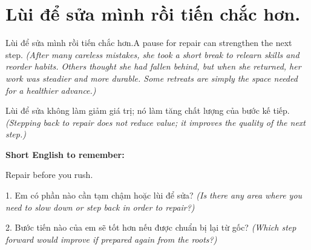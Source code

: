 \section{Lùi để sửa mình rồi tiến chắc hơn.}
\begin{truyen}{Lùi để sửa mình rồi tiến chắc hơn.}{A pause for repair can strengthen the next step.}
\textit{(After many careless mistakes, she took a short break to relearn skills and reorder habits. Others thought she had fallen behind, but when she returned, her work was steadier and more durable. Some retreats are simply the space needed for a healthier advance.)}
\end{truyen}
\begin{baihoc}
Lùi để sửa không làm giảm giá trị; nó làm tăng chất lượng của bước kế tiếp.
\textit{(Stepping back to repair does not reduce value; it improves the quality of the next step.)}
\end{baihoc}
\begin{ghinhoanh}
\textbf{Short English to remember:}

Repair before you rush.
\end{ghinhoanh}
\begin{tuhocnhanh}
1. Em có phần nào cần tạm chậm hoặc lùi để sửa? \textit{(Is there any area where you need to slow down or step back in order to repair?)}

2. Bước tiến nào của em sẽ tốt hơn nếu được chuẩn bị lại từ gốc? \textit{(Which step forward would improve if prepared again from the roots?)}
\end{tuhocnhanh}
\ngancach
